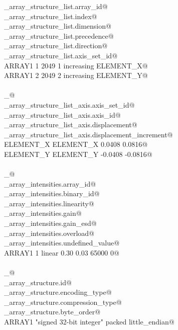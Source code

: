 \documentclass[10pt,a4paper,twoside,notitlepage]{article}
\begin{document}
\begin{flushleft}
\begin{minipage}{\linewidth}
\begin{list}{}{}
\mbox{}\verb@_array_structure_list.array_id@\\
\mbox{}\verb@_array_structure_list.index@\\
\mbox{}\verb@_array_structure_list.dimension@\\
\mbox{}\verb@_array_structure_list.precedence@\\
\mbox{}\verb@_array_structure_list.direction@\\
\mbox{}\verb@_array_structure_list.axis_set_id@\\
\mbox{}\verb@ ARRAY1 1 2049 1 increasing ELEMENT_X@\\
\mbox{}\verb@ ARRAY1 2 2049 2 increasing ELEMENT_Y@\\
\mbox{}\verb@@\\
\mbox{}\verb@loop_@\\
\mbox{}\verb@_array_structure_list_axis.axis_set_id@\\
\mbox{}\verb@_array_structure_list_axis.axis_id@\\
\mbox{}\verb@_array_structure_list_axis.displacement@\\
\mbox{}\verb@_array_structure_list_axis.displacement_increment@\\
\mbox{}\verb@ ELEMENT_X ELEMENT_X 0.0408 0.0816@\\
\mbox{}\verb@ ELEMENT_Y ELEMENT_Y -0.0408 -0.0816@\\
\mbox{}\verb@@\\
\mbox{}\verb@loop_@\\
\mbox{}\verb@_array_intensities.array_id@\\
\mbox{}\verb@_array_intensities.binary_id@\\
\mbox{}\verb@_array_intensities.linearity@\\
\mbox{}\verb@_array_intensities.gain@\\
\mbox{}\verb@_array_intensities.gain_esd@\\
\mbox{}\verb@_array_intensities.overload@\\
\mbox{}\verb@_array_intensities.undefined_value@\\
\mbox{}\verb@ ARRAY1 1 linear 0.30 0.03 65000 0@\\
\mbox{}\verb@@\\
\mbox{}\verb@loop_@\\
\mbox{}\verb@_array_structure.id@\\
\mbox{}\verb@_array_structure.encoding_type@\\
\mbox{}\verb@_array_structure.compression_type@\\
\mbox{}\verb@_array_structure.byte_order@\\
\mbox{}\verb@ ARRAY1 "signed 32-bit integer" packed little_endian@\\
\mbox{}\verb@@{\NWsep}
\end{list}
\vspace{-1.5ex}
\footnotesize
\begin{list}{}{\setlength{\itemsep}{-\parsep}\setlength{\itemindent}{-\leftmargin}}


\end{list}
\end{minipage}
\end{flushleft}
\end{document}
